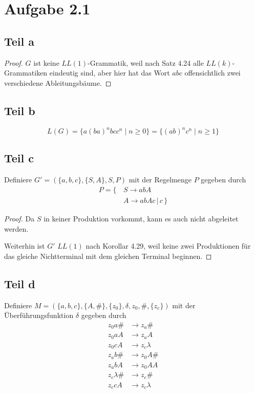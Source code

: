 \documentclass[10pt,a4paper]{article}
\begin{document}
\section{Aufgabe 2.1}

\subsection{Teil a}

\begin{proof}
  $G$ ist keine $LL(1)$-Grammatik, weil nach Satz 4.24 alle $LL(k)$-Grammatiken eindeutig sind, aber hier hat das Wort $abc$ offensichtlich zwei verschiedene Ableitungsbäume.
\end{proof}

\subsection{Teil b}

\begin{equation}
  L(G) = \{ a(ba)^{n}bcc^{n} \mid n \ge 0 \} = \{ (ab)^{n}c^{n} \mid n \ge 1 \}
\end{equation}

\subsection{Teil c}

Definiere $G' = (\{ a, b, c \}, \{ S, A \}, S, P)$ mit der Regelmenge $P$ gegeben durch
\begin{align*}
  P = \{ \, & S \rightarrow abA\\
   & A \rightarrow abAc\, |\, c \,\}
\end{align*}
\begin{proof}
  Da $S$ in keiner Produktion vorkommt, kann es auch nicht abgeleitet werden.

  Weiterhin ist $G'$ $LL(1)$ nach Korollar 4.29, weil keine zwei Produktionen für das gleiche Nichtterminal mit dem gleichen Terminal beginnen.
\end{proof}

\subsection{Teil d}

Definiere $M = (\{ a, b, c \}, \{ A, \# \}, \{ z_{0} \}, \delta, z_{0}, \#, \{ z_{e} \})$ mit der Überführungsfunktion $\delta$ gegeben durch
\begin{align*}
  z_{0}a\# & \rightarrow z_{a}\#\\
  z_{0}aA & \rightarrow z_{a}A\\
  z_{0}cA & \rightarrow z_{c}\lambda\\
  z_{a}b\# & \rightarrow z_{0}A\#\\
  z_{a}bA & \rightarrow z_{0}AA\\
  z_{c}\lambda\# & \rightarrow z_{e}\#\\
  z_{c}cA & \rightarrow z_{c}\lambda
\end{align*}
\end{document}
